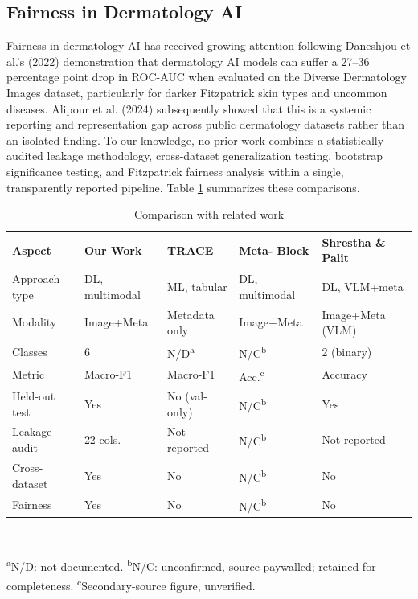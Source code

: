 \documentclass[conference]{IEEEtran}
\begin{document}
\subsection{Fairness in Dermatology AI}
Fairness in dermatology AI has received growing attention following Daneshjou et al.'s (2022) demonstration that dermatology AI models can suffer a 27--36 percentage point drop in ROC-AUC when evaluated on the Diverse Dermatology Images dataset, particularly for darker Fitzpatrick skin types and uncommon diseases. Alipour et al. (2024) subsequently showed that this is a systemic reporting and representation gap across public dermatology datasets rather than an isolated finding. To our knowledge, no prior work combines a statistically-audited leakage methodology, cross-dataset generalization testing, bootstrap significance testing, and Fitzpatrick fairness analysis within a single, transparently reported pipeline. Table \ref{tab:litcompare} summarizes these comparisons.

\begin{table}[t]
\caption{Comparison with related work}
\label{tab:litcompare}
\centering
\scriptsize
\begin{tabular}{|p{1.3cm}|p{1.1cm}|p{1.1cm}|p{1.15cm}|p{1.15cm}|}
\hline
\textbf{Aspect} & \textbf{Our Work} & \textbf{TRACE} & \textbf{Meta- Block} & \textbf{Shrestha \& Palit} \\
\hline
Approach type & DL, multimodal & ML, tabular & DL, multimodal & DL, VLM+meta \\
\hline
Modality & Image+Meta & Metadata only & Image+Meta & Image+Meta (VLM) \\
\hline
Classes & 6 & N/D\textsuperscript{a} & N/C\textsuperscript{b} & 2 (binary) \\
\hline
Metric & Macro-F1 & Macro-F1 & Acc.\textsuperscript{c} & Accuracy \\
\hline
Held-out test & Yes & No (val-only) & N/C\textsuperscript{b} & Yes \\
\hline
Leakage audit & 22 cols. & Not reported & N/C\textsuperscript{b} & Not reported \\
\hline
Cross-dataset & Yes & No & N/C\textsuperscript{b} & No \\
\hline
Fairness & Yes & No & N/C\textsuperscript{b} & No \\
\hline
\end{tabular}
\\[2pt]
\raggedright{\scriptsize \textsuperscript{a}N/D: not documented. \textsuperscript{b}N/C: unconfirmed, source paywalled; retained for completeness. \textsuperscript{c}Secondary-source figure, unverified.}
\end{table}
\end{document}

